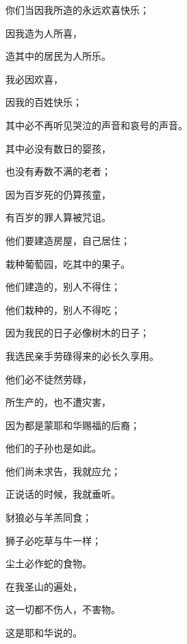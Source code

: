 {\par }{\Q {}你们当因我所造的永远欢喜快乐；
\par }{\Q 因我造{}为人所喜，
\par }{\Q 造其中的居民为人所乐。
\par }{\Q {}我必因{}欢喜，
\par }{\Q 因我的百姓快乐；
\par }{\Q 其中必不再听见哭泣的声音和哀号的声音。
\par }{\Q {}其中必没有数日{}的婴孩，
\par }{\Q 也没有寿数不满的老者；
\par }{\Q 因为百岁死的仍算孩童，
\par }{\Q 有百岁{}的罪人算被咒诅。
\par }{\Q {}他们要建造房屋，自己居住；
\par }{\Q 栽种葡萄园，吃其中的果子。
\par }{\Q {}他们建造的，别人不得住；
\par }{\Q 他们栽种的，别人不得吃；
\par }{\Q 因为我民的日子必像树木的日子；
\par }{\Q 我选民亲手劳碌得来的必长久享用。
\par }{\Q {}他们必不徒然劳碌，
\par }{\Q 所生产的，也不遭灾害，
\par }{\Q 因为都是蒙耶和华赐福的后裔；
\par }{\Q 他们的子孙也是如此。
\par }{\Q {}他们尚未求告，我就应允；
\par }{\Q 正说话的时候，我就垂听。
\par }{\Q {}豺狼必与羊羔同食；
\par }{\Q 狮子必吃草与牛一样；
\par }{\Q 尘土必作蛇的食物。
\par }{\Q 在我圣山的遍处，
\par }{\Q 这一切都不伤人，不害物。
\par }{\Q 这是耶和华说的。

}
